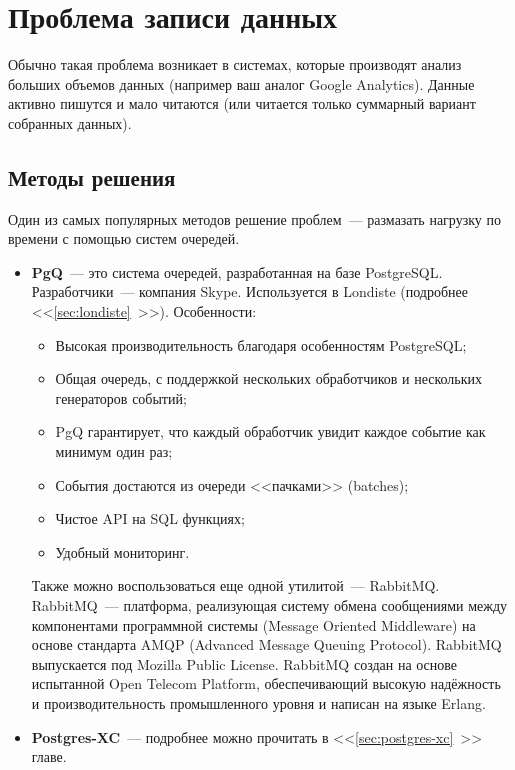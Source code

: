 \section{Проблема записи данных}

Обычно такая проблема возникает в системах, которые производят анализ больших объемов данных (например ваш аналог Google Analytics). Данные активно пишутся и мало читаются (или читается только суммарный вариант собранных данных).

\subsection{Методы решения}

Один из самых популярных методов решение проблем~--- размазать нагрузку по времени с помощью систем очередей.

\begin{itemize}
  \item \textbf{PgQ}~--- это система очередей, разработанная на базе PostgreSQL. Разработчики~--- компания Skype. Используется в Londiste (подробнее <<\ref{sec:londiste}~>>). Особенности:

  \begin{itemize}
    \item Высокая производительность благодаря особенностям PostgreSQL;
    \item Общая очередь, с поддержкой нескольких обработчиков и нескольких генераторов событий;
    \item PgQ гарантирует, что каждый обработчик увидит каждое событие как минимум один раз;
    \item События достаются из очереди <<пачками>> (batches);
    \item Чистое API на SQL функциях;
    \item Удобный мониторинг.
  \end{itemize}

Также можно воспользоваться еще одной утилитой~--- RabbitMQ. RabbitMQ~--- платформа, реализующая систему обмена сообщениями между компонентами программной системы (Message Oriented Middleware) на основе стандарта AMQP (Advanced Message Queuing Protocol). RabbitMQ выпускается под Mozilla Public License. RabbitMQ создан на основе испытанной Open Telecom Platform, обеспечивающий высокую надёжность и производительность промышленного уровня и написан на языке Erlang.

  \item \textbf{Postgres-XC}~--- подробнее можно прочитать в <<\ref{sec:postgres-xc}~>> главе.
\end{itemize}